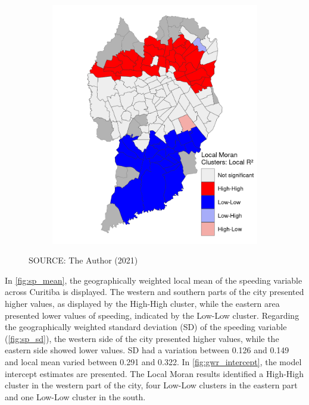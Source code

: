 \begin{figure}[!htbp]
\begin{subfigure}{0.5\textwidth}
        \includegraphics{fig/lisa_local_R2.png}
    \end{subfigure}    
    \label{fig:r2_map}
    \par SOURCE: The Author (2021)
\end{figure}

In \autoref{fig:sp_mean}, the geographically weighted local mean of the speeding variable across Curitiba is displayed. The western and southern parts of the city presented higher values, as displayed by the High-High cluster, while the eastern area presented lower values of speeding, indicated by the Low-Low cluster. Regarding the geographically weighted standard deviation (SD) of the speeding variable (\autoref{fig:sp_sd}), the western side of the city presented higher values, while the eastern side showed lower values. SD had a variation between 0.126 and 0.149 and local mean varied between 0.291 and 0.322. In \autoref{fig:gwr_intercept}, the model intercept estimates are presented. The Local Moran results identified a High-High cluster in the western part of the city, four Low-Low clusters in the eastern part and one Low-Low cluster in the south. 

